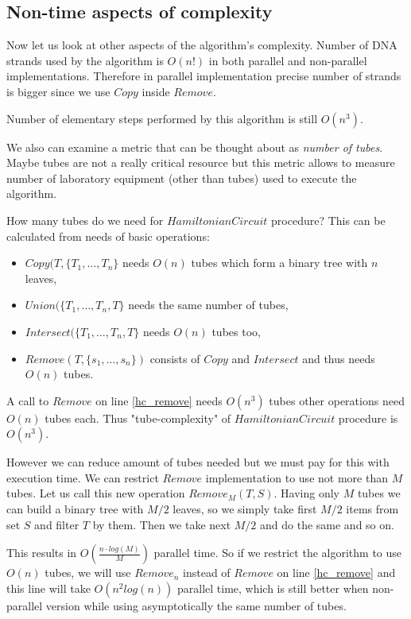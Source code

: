 \subsection{Non-time aspects of complexity}
Now let us look at other aspects of the algorithm's complexity. Number of DNA strands used by the algorithm is $O(n!)$ in both parallel and non-parallel implementations. Therefore in parallel implementation precise number of strands is bigger since we use $Copy$ inside $Remove$.

Number of elementary steps performed by this algorithm is still $O(n^3)$.

We also can examine a metric that can be thought about as \emph{number of tubes}. Maybe tubes are not a really critical resource but this metric allows to measure number of laboratory equipment (other than tubes) used to execute the algorithm. 

How many tubes do we need for $HamiltonianCircuit$ procedure? This can be calculated from needs of basic operations:
\begin{itemize}
	\item $Copy(T, \{T_1, \dots, T_n\}$ needs $O(n)$ tubes which form a binary tree with $n$ leaves,
	\item $Union(\{T_1, \dots, T_n, T\}$ needs the same number of tubes,
	\item $Intersect(\{T_1, \dots, T_n, T\}$ needs $O(n)$ tubes too,
	\item $Remove(T, \{s_1, \dots, s_n\})$ consists of $Copy$ and $Intersect$ and thus needs $O(n)$ tubes.
\end{itemize}

A call to $Remove$ on line \ref{hc_remove} needs $O(n^3)$ tubes other operations need $O(n)$ tubes each. Thus "tube-complexity" of $HamiltonianCircuit$ procedure is $O(n^3)$. 

However we can reduce amount of tubes needed but we must pay for this with execution time. We can restrict $Remove$ implementation to use not more than $M$ tubes. Let us call this new operation $Remove_M(T, S)$. Having only $M$ tubes we can build a binary tree with $M/2$ leaves, so we simply take first $M/2$ items from set $S$ and filter $T$ by them. Then we take next $M/2$ and do the same and so on.


This results in $O\left(\frac{n \cdot log(M)}{M}\right)$ parallel time. So if we restrict the algorithm to use $O(n)$ tubes, we will use $Remove_n$ instead of $Remove$ on line \ref{hc_remove} and this line will take $O( n^2 log(n))$ parallel time, which is still better when non-parallel version while using asymptotically the same number of tubes.